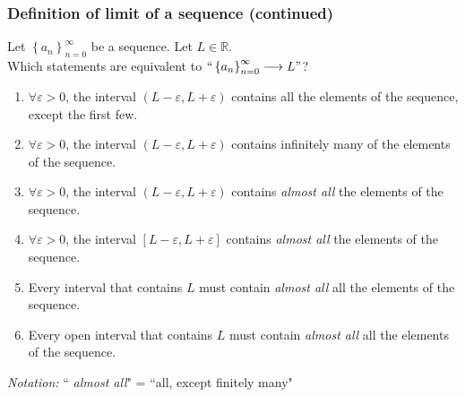 \begin{frame}[t]
	\fontsize{12}{12}\selectfont
	\frametitle{Definition of limit of a sequence (continued)}

	Let $\displaystyle \left\{ a_{n} \right\}_{n=0}^{\infty}$ be a sequence. Let
	$\displaystyle L \in \mathbb{R}$. \\ Which statements are equivalent to $\displaystyle
	``\left\{ a_{n} \right\}_{n=0}^{\infty}\longrightarrow L"$?

	\begin{enumerate}
		\addtocounter{enumi}{9}

		\item $\displaystyle \forall \varepsilon >0$, the interval
			$\displaystyle (L-\varepsilon, L+\varepsilon)$ contains all the elements
			of the sequence, except the first few.

		\item $\displaystyle \forall \varepsilon >0$, the interval
			$\displaystyle (L-\varepsilon, L+\varepsilon)$ contains infinitely many of
			the elements of the sequence.

		\item $\displaystyle \forall \varepsilon >0$, the interval
			$\displaystyle (L-\varepsilon, L+\varepsilon)$ contains \emph{{\color{red} almost all}}
			the elements of the sequence.

		\item $\displaystyle \forall \varepsilon >0$, the interval
			$\displaystyle [L-\varepsilon, L+\varepsilon]$ contains \emph{{\color{red} almost all}}
			the elements of the sequence.

		\item Every interval that contains $L$ must contain \emph{{\color{red} almost all}}
			all the elements of the sequence.

		\item Every open interval that contains $L$ must contain \emph{{\color{red} almost all}}
			all the elements of the sequence.
	\end{enumerate}

	\emph{Notation:} ``\emph{{\color{red} almost all}}" = ``all, except finitely
	many"
\end{frame}

